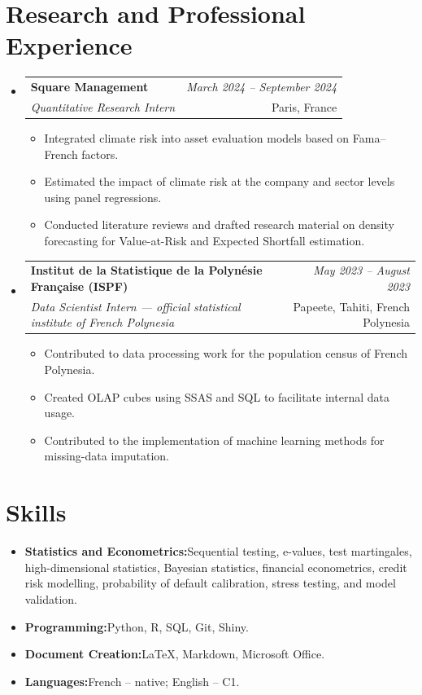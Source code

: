\documentclass[a4paper,11pt]{article}
\makeatletter
\newcommand{\resumeItem}[2]{
  \item{
    \textbf{#1}{\hspace{0.5mm}#2 \vspace{-0.5mm}}
  }
}
\newcommand{\resumeSubheading}[4]{
\vspace{0.5mm}\item
    \begin{tabular*}{0.98\textwidth}[t]{l@{\extracolsep{\fill}}r}
        \textbf{#1} & \textit{\footnotesize{#4}} \\
        \textit{\footnotesize{#3}} &  \footnotesize{#2}\\
    \end{tabular*}
    \vspace{-2.4mm}
}
\newcommand{\resumeSubItem}[2]{\resumeItem{#1}{#2}\vspace{-4pt}}
\newcommand{\resumeSubHeadingListStart}{\begin{itemize}[leftmargin=*,labelsep=1mm]}
\newcommand{\resumeHeadingSkillStart}{\begin{itemize}[leftmargin=*,itemsep=1.7mm, rightmargin=2ex]\small}
\newcommand{\resumeItemListStart}{\begin{itemize}[leftmargin=*,labelsep=1mm,itemsep=0.5mm]\small}
\newcommand{\resumeSubHeadingListEnd}{\end{itemize}\vspace{2mm}}
\newcommand{\resumeHeadingSkillEnd}{\end{itemize}\vspace{-2mm}}
\newcommand{\resumeItemListEnd}{\end{itemize}\vspace{-2mm}}
\makeatother
\begin{document}
\section{\textbf{Research and Professional Experience}}
\vspace{-0.4mm}
\resumeSubHeadingListStart
\resumeSubheading
{Square Management}{Paris, France}
{Quantitative Research Intern}{March 2024 -- September 2024}
\resumeItemListStart
\item Integrated climate risk into asset evaluation models based on Fama--French factors.
\item Estimated the impact of climate risk at the company and sector levels using panel regressions.
\item Conducted literature reviews and drafted research material on density forecasting for Value-at-Risk and Expected Shortfall estimation.
\resumeItemListEnd
\resumeSubheading
{Institut de la Statistique de la Polynésie Française (ISPF)}{Papeete, Tahiti, French Polynesia}
{Data Scientist Intern --- official statistical institute of French Polynesia}{May 2023 -- August 2023}
\resumeItemListStart
\item Contributed to data processing work for the population census of French Polynesia.
\item Created OLAP cubes using SSAS and SQL to facilitate internal data usage.
\item Contributed to the implementation of machine learning methods for missing-data imputation.
\resumeItemListEnd
\resumeSubHeadingListEnd
\vspace{-6mm}
\section{\textbf{Skills}}
\vspace{-0.4mm}
\resumeHeadingSkillStart
\resumeSubItem{Statistics and Econometrics:}
    {Sequential testing, e-values, test martingales, high-dimensional statistics, Bayesian statistics, financial econometrics, credit risk modelling, probability of default calibration, stress testing, and model validation.}
\resumeSubItem{Programming:}
    {Python, R, SQL, Git, Shiny.}
\resumeSubItem{Document Creation:}
    {LaTeX, Markdown, Microsoft Office.}
\resumeSubItem{Languages:}
    {French -- native; English -- C1.}
\resumeHeadingSkillEnd
\end{document}
